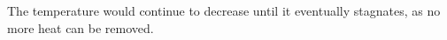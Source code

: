 The temperature would continue to decrease until it eventually stagnates, as no more heat can be removed.